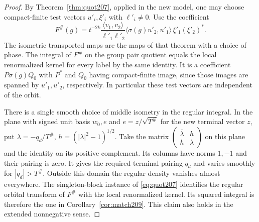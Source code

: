 \documentclass[a4paper,11pt]{article}
\theoremstyle{definition}
\theoremstyle{remark}
\numberwithin{equation}{section}
\begin{document}
\begin{proof}
By Theorem~\ref{thm:quot207}, applied in the new model, one
may choose compact-finite test vectors \(u'_i,\xi'_i\) with
\(\ell'_i\ne0\). Use the coefficient
\[
 F^\#(g)=
 t^{-2k}\frac{\langle v_1,v_2\rangle}{\overline{\ell'_1}\ell'_2}
       \langle\sigma(g)u'_2,u'_1\rangle\,\xi'_1(\xi'_2)^* .
\]
The isometric transported maps are the maps of that theorem
with a choice of phase. The integral of \(F^\#\) on the group
pair quotient equals the local renormalized kernel for every
label by the same identity. It is a coefficient \(P\sigma(g)Q_0\)
with \(P^*\) and \(Q_0\) having compact-finite image, since those
images are spanned by \(u'_1,u'_2\), respectively. In particular
these test vectors are independent of the orbit.

There is a single smooth choice of middle isometry in the regular
integral. In the plane with signed unit basis \(w_0,e\) and
\(e=z/\sqrt{T^\#}\) for the new terminal vector \(z\), put
\(\lambda=-q_d/T^\#\), \(h=(|\lambda|^2-1)^{1/2}\). Take the matrix
\(\left(\begin{smallmatrix}\bar\lambda&h\\h&\lambda\end{smallmatrix}\right)\)
on this plane and the identity on its positive complement.
Its columns have norms \(1,-1\) and their pairing is zero.
It gives the required terminal pairing \(q_d\) and varies
smoothly for \(|q_d|>T^\#\). Outside this domain the regular
density vanishes almost everywhere. The singleton-block instance
of \eqref{eq:quot207} identifies the regular orbital transform of
\(F^\#\) with the local renormalized kernel. Its squared integral
is therefore the one in Corollary~\ref{cor:match209}. This claim
also holds in the extended nonnegative sense.
\end{proof}
\end{document}
